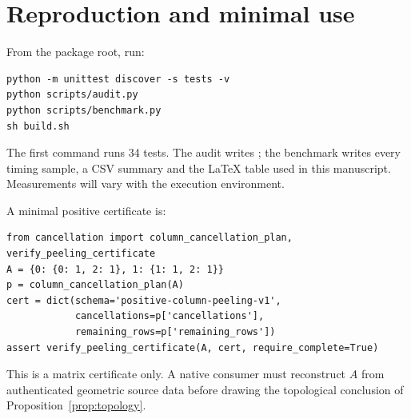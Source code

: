 \documentclass[11pt]{article}
\theoremstyle{definition}\newtheorem{definition}[theorem]{Definition}
\theoremstyle{remark}\newtheorem{remark}[theorem]{Remark}
\begin{document}
\section{Reproduction and minimal use}
From the package root, run:
\begin{lstlisting}
python -m unittest discover -s tests -v
python scripts/audit.py
python scripts/benchmark.py
sh build.sh
\end{lstlisting}
The first command runs 34 tests. The audit writes ; the benchmark writes every timing sample, a CSV summary and the LaTeX table used in this manuscript. Measurements will vary with the execution environment.

A minimal positive certificate is:
\begin{lstlisting}
from cancellation import column_cancellation_plan, verify_peeling_certificate
A = {0: {0: 1, 2: 1}, 1: {1: 1, 2: 1}}
p = column_cancellation_plan(A)
cert = dict(schema='positive-column-peeling-v1',
            cancellations=p['cancellations'],
            remaining_rows=p['remaining_rows'])
assert verify_peeling_certificate(A, cert, require_complete=True)
\end{lstlisting}
This is a matrix certificate only. A native consumer must reconstruct $A$ from authenticated geometric source data before drawing the topological conclusion of Proposition~\ref{prop:topology}.
\end{document}
